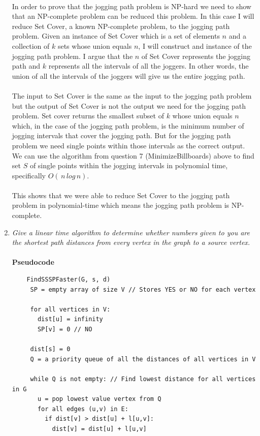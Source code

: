 \documentclass[12pt]{article}
\begin{document}
\begin{enumerate}
	\\
	In order to prove that the jogging path problem is NP-hard we need to show that an NP-complete problem can be reduced this problem.  
	In this case I will reduce Set Cover, a known NP-complete problem, to the jogging path problem.
	Given an instance of Set Cover which is a set of elements $n$ and a collection of $k$ sets whose union equals $n$, I will construct and instance of the jogging path problem.
	I argue that the $n$ of Set Cover represents the jogging path and $k$ represents all the intervals of all the joggers.  In other words, the union of all the intervals of the joggers
	will give us the entire jogging path.\\
	\\
	The input to Set Cover is the same as the input to the jogging path problem but the output of Set Cover is not the output we need for the jogging path problem.
	Set cover returns the smallest subset of $k$ whose union equals $n$ which, in the case of the jogging path problem, is the minimum number of jogging intervals that cover the jogging path.
	But for the jogging path problem we need single points within those intervals as the correct output.  
	We can use the algorithm from question 7 (MinimizeBillboards) above to find set $S$ of single points within the jogging intervals in polynomial time, specifically $O(\,n\,log\,n)$.\\
	\\
	This shows that we were able to reduce Set Cover to the jogging path problem in polynomial-time which means the jogging path problem is NP-complete.
	
	
	\newpage
	\item \textit{Give a linear time algorithm to determine whether numbers given to you are the shortest path distances from every vertex in the graph to a source vertex.}\\
	\\
	\textbf{Pseudocode}
	\begin{verbatim}
	FindSSSPFaster(G, s, d)
	 SP = empty array of size V // Stores YES or NO for each vertex
	 
	 for all vertices in V:
	   dist[u] = infinity
	   SP[v] = 0 // NO
	   
	 dist[s] = 0
	 Q = a priority queue of all the distances of all vertices in V
	 
	 while Q is not empty: // Find lowest distance for all vertices in G
	   u = pop lowest value vertex from Q
	   for all edges (u,v) in E:
	     if dist[v] > dist[u] + l[u,v]:
	       dist[v] = dist[u] + l[u,v]
	       

\end{verbatim}
\end{enumerate}
\end{document}
